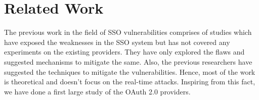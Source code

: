 \section{Related Work}
\label{sec:related}
The previous work in the field of SSO vulnerabilities comprises of studies which have exposed the weaknesses in the SSO system but has not covered any experiments on the existing providers.\cite{bala:login-csrf} They have only explored the flaws and suggested mechanisms to mitigate the same.\cite{barth:robust-defenses} Also, the previous researchers have suggested the techniques to mitigate the vulnerabilities. Hence, most of the work is theoretical and doesn't focus on the real-time attacks. Inspiring from this fact, we have done a first large study of the OAuth 2.0 providers.
